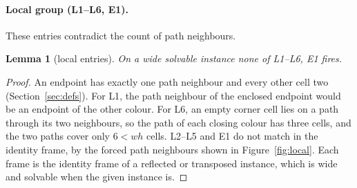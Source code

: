 \documentclass[11pt]{article}
\newtheorem{lemma}[theorem]{Lemma}
\newcommand{\ent}[1]{\textsf{#1}}
\begin{document}
\paragraph{Local group (\ent{L1}--\ent{L6}, \ent{E1}).}
These entries contradict the count of path neighbours.

\begin{lemma}[local entries]\label{lem:local}
On a wide solvable instance none of \ent{L1}--\ent{L6}, \ent{E1} fires.
\end{lemma}
\begin{proof}
An endpoint has exactly one path neighbour and every other cell two (Section~\ref{sec:defs}).
For \ent{L1}, the path neighbour of the enclosed endpoint would be an endpoint of the other colour.
For \ent{L6}, an empty corner cell lies on a path through its two neighbours, so the path of each
closing colour has three cells, and the two paths cover only $6<wh$ cells.
\ent{L2}--\ent{L5} and \ent{E1} do not match in the identity frame, by the forced path neighbours
shown in Figure~\ref{fig:local}. Each frame is the identity frame of a reflected or transposed
instance, which is wide and solvable when the given instance is.
\end{proof}
\end{document}
